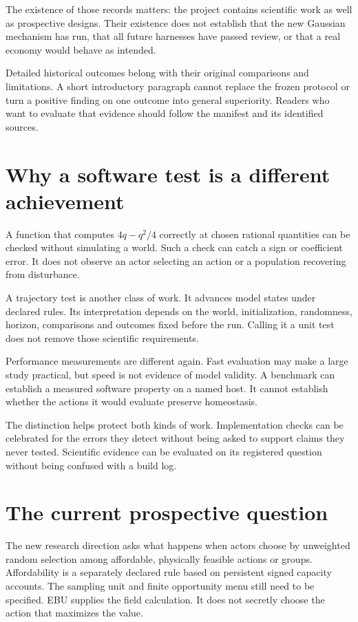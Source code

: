 The existence of those records matters: the project contains scientific work as well as prospective designs. Their existence does not establish that the new Gaussian mechanism has run, that all future harnesses have passed review, or that a real economy would behave as intended.

Detailed historical outcomes belong with their original comparisons and limitations. A short introductory paragraph cannot replace the frozen protocol or turn a positive finding on one outcome into general superiority. Readers who want to evaluate that evidence should follow the manifest and its identified sources.

\section{Why a software test is a different achievement}
A function that computes $4q-q^2/4$ correctly at chosen rational quantities can be checked without simulating a world. Such a check can catch a sign or coefficient error. It does not observe an actor selecting an action or a population recovering from disturbance.

A trajectory test is another class of work. It advances model states under declared rules. Its interpretation depends on the world, initialization, randomness, horizon, comparisons and outcomes fixed before the run. Calling it a unit test does not remove those scientific requirements.

Performance measurements are different again. Fast evaluation may make a large study practical, but speed is not evidence of model validity. A benchmark can establish a measured software property on a named host. It cannot establish whether the actions it would evaluate preserve homeostasis.

The distinction helps protect both kinds of work. Implementation checks can be celebrated for the errors they detect without being asked to support claims they never tested. Scientific evidence can be evaluated on its registered question without being confused with a build log.

\section{The current prospective question}
The new research direction asks what happens when actors choose by unweighted random selection among affordable, physically feasible actions or groups. Affordability is a separately declared rule based on persistent signed capacity accounts. The sampling unit and finite opportunity menu still need to be specified. EBU supplies the field calculation. It does not secretly choose the action that maximizes the value.


